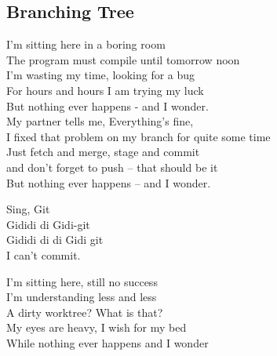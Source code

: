 \subsection{Branching Tree}

I'm sitting here in a boring room \\
The program must compile until tomorrow noon \\
I'm wasting my time, looking for a bug \\
For hours and hours I am trying my luck \\
But nothing ever happens - and I wonder.  \\

My partner tells me, \glqq Everything's fine, \\
I fixed that problem on my branch for quite some time \\
Just fetch and merge, stage and commit \\
and don't forget to push -- that should be it\grqq \\
But nothing ever happens -- and I wonder. \\


Sing, Git  \\
 Gididi di Gidi-git \\
 Gididi di di Gidi git \\
 I can’t commit. \ \ \ \  \\

\pagebreak

I’m sitting here, still no success \\
I’m understanding less and less \\
A dirty worktree? What is that? \\
My eyes are heavy, I wish for my bed \\
While nothing ever happens and I wonder \\

